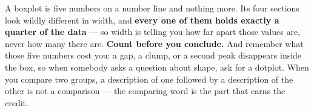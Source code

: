 \documentclass[12pt]{article}
\begin{document}
\vspace{0.14in}

\boxguard[8]
\begin{remindbox}
\small
A boxplot is five numbers on a number line and nothing more. Its four sections look wildly
different in width, and \textbf{every one of them holds exactly a quarter of the data} --- so
width is telling you how far apart those values are, never how many there are. \textbf{Count
before you conclude.} And remember what those five numbers cost you: a gap, a clump, or a second
peak disappears inside the box, so when somebody asks a question about shape, ask for a dotplot.
When you compare two groups, a description of one followed by a description of the other is not a
comparison --- the comparing word is the part that earns the credit.
\end{remindbox}
\end{document}
